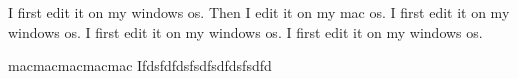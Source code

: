 I first edit it on my windows os.
Then I edit it on my mac os.
I first edit it on my windows os.
I first edit it on my windows os.
I first edit it on my windows os.

macmacmacmacmac
Ifdsfdfdsfsdfsdfdsfsdfd

